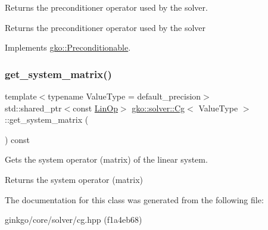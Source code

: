 Returns the preconditioner operator used by the solver. 

\begin{DoxyReturn}{Returns}
the preconditioner operator used by the solver 
\end{DoxyReturn}


Implements \hyperlink{classgko_1_1Preconditionable_ad9545089aef0dfc83bc7a74e5bf1d748}{gko\+::\+Preconditionable}.

\mbox{\label{classgko_1_1solver_1_1Cg_a09d50a99fdc668316757ee253386ad2a}} 
\subsubsection{\texorpdfstring{get\+\_\+system\+\_\+matrix()}{get\_system\_matrix()}}
{\footnotesize\ttfamily template$<$typename Value\+Type  = default\+\_\+precision$>$ \\
std\+::shared\+\_\+ptr$<$const \hyperlink{classgko_1_1LinOp}{Lin\+Op}$>$ \hyperlink{classgko_1_1solver_1_1Cg}{gko\+::solver\+::\+Cg}$<$ Value\+Type $>$\+::get\+\_\+system\+\_\+matrix (\begin{DoxyParamCaption}{ }\end{DoxyParamCaption}) const\hspace{0.3cm}{\ttfamily [inline]}}



Gets the system operator (matrix) of the linear system. 

\begin{DoxyReturn}{Returns}
the system operator (matrix) 
\end{DoxyReturn}


The documentation for this class was generated from the following file\+:\begin{DoxyCompactItemize}
\item 
ginkgo/core/solver/cg.\+hpp (f1a4eb68)\end{DoxyCompactItemize}
